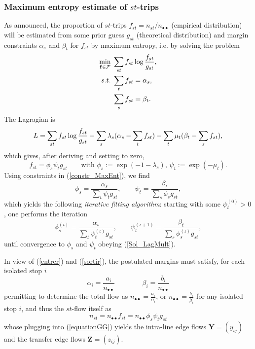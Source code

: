 \documentclass{bmcart}
\begin{document}
\subsubsection{Maximum entropy estimate of $st$-trips}
\label{maxenso}
As announced,  the proportion of $st$-trips $f_{st}=n_{st}/n_{\bullet\bullet}$ (empirical distribution) will be estimated from some prior guess $g_{st}$ (theoretical distribution) and 
margin constraints $\alpha_s$ and $\beta_t$ for $f_{st}$ by maximum entropy, i.e. by 
solving the problem 
\begin{align}
	\label{constr_MaxEnt}
	\min_{\mathbf{f}\in\mathcal{F}} &\; \sum_{st}f_{st}\log \frac{f_{st}}{g_{st}}, \notag \\
	s.t. &\; \sum_t f_{st} = \alpha_s, \notag \\
	&\; \sum_s f_{st} = \beta_t.
\end{align}
The Lagragian is
\begin{equation}
	L = \sum_{st}f_{st}\log \frac{f_{st}}{g_{st}} - \sum_s \lambda_s (\alpha_s - \sum_t f_{st}) - \sum_t \mu_t (\beta_t - \sum_s f_{st}), \notag
\end{equation}
which gives, after deriving and setting to zero,
\begin{equation}
	\label{Sol}
	f_{st} = \phi_s \psi_t g_{st} \qquad \text{with } \phi_s := \exp(- 1 - \lambda_s) \text{, } \psi_t := \exp(- \mu_t).
\end{equation}
Using constraints in (\ref{constr_MaxEnt}), we find
\begin{equation}
	\label{Sol_LagMult}
	\phi_s = \frac{\alpha_s}{\sum_t \psi_t g_{st}}, \qquad \psi_t = \frac{\beta_t}{\sum_s \phi_s g_{st}}, 
\end{equation}
which yields the following \emph{iterative fitting algorithm}: starting with some $\psi^{(0)}_t > 0$, one performs the iteration
\begin{equation}
	\label{Iterative fitting}
	\phi^{(\iota)}_s = \frac{\alpha_s}{\sum_t \psi^{(\iota)}_t g_{st}}, \qquad \psi^{(\iota + 1)}_t = \frac{\beta_t}{\sum_s \phi^{(\iota)}_s g_{st}}, 
\end{equation}
until convergence to $\phi_s$ and $\psi_t$ obeying (\ref{Sol_LagMult}). 

In view of (\ref{entrer}) and (\ref{sortir}), the postulated margins must satisfy, for each isolated stop $i$
\begin{equation}
\label{ }
\alpha_i=\frac{a_i}{n_{\bullet \bullet}}\qquad\qquad \beta_i=\frac{b_i}{n_{\bullet \bullet}}
\end{equation}
permitting to determine the total flow as $n_{\bullet \bullet}=\frac{a_i}{\alpha_i}$, or  $n_{\bullet \bullet}=\frac{b_i}{\beta_i}$ for any isolated stop $i$, and thus 
the $st$-flow itself as 
\begin{equation}
	\label{flow_from_distrib}
	n_{st} = n_{\bullet \bullet} f_{st}= n_{\bullet \bullet}\phi_s \psi_t g_{st} 
\end{equation}
whose plugging into (\ref{equationGG}) yields the intra-line edge flows $\mathbf{Y}=(y_{ij})$ and the transfer edge flows $\mathbf{Z}=(z_{ij})$.
\end{document}
